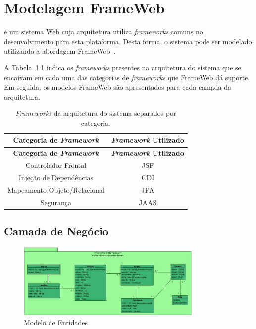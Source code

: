 
\chapter{Modelagem FrameWeb}
\label{sec-frameweb}
\vspace{-1cm}

\emph{\imprimirtitulo} é um sistema Web cuja arquitetura utiliza \textit{frameworks} comuns no desenvolvimento para esta plataforma. Desta forma, o sistema pode ser modelado utilizando a abordagem FrameWeb~\cite{souza-celebratingfalbo20}.

A Tabela~\ref{tabela-frameworks} indica os \textit{frameworks} presentes na arquitetura do sistema que se encaixam em cada uma das categorias de \textit{frameworks} que FrameWeb dá suporte. Em seguida, os modelos FrameWeb são apresentados para cada camada da arquitetura.

\begin{footnotesize}
	\begin{longtable}{|c|c|}
		\caption{\textit{Frameworks} da arquitetura do sistema separados por categoria.}
		\label{tabela-frameworks}\\\hline
		
		\rowcolor{lightgray}
		\textbf{Categoria de \textit{Framework}} & \textbf{\textit{Framework} Utilizado} \\\hline 
		\endfirsthead
		\hline
		\rowcolor{lightgray}
		\textbf{Categoria de \textit{Framework}} & \textbf{\textit{Framework} Utilizado} \\\hline 
		\endhead

		Controlador Frontal & {JSF} \\\hline

		Injeção de Dependências & {CDI} \\\hline

		Mapeamento Objeto/Relacional & {JPA} \\\hline

		Segurança & {JAAS} \\\hline
	\end{longtable}
\end{footnotesize}




\section{Camada de Negócio}
\label{sec-frameweb-negocio}

\begin{figure}[h]
    \centering
    \includegraphics[width=0.8\textwidth]{figuras/Modelo de Entidades.jpg}
    \caption{Modelo de Entidades}
    \label{Modelo de Entidades.jpg}
\end{figure}



